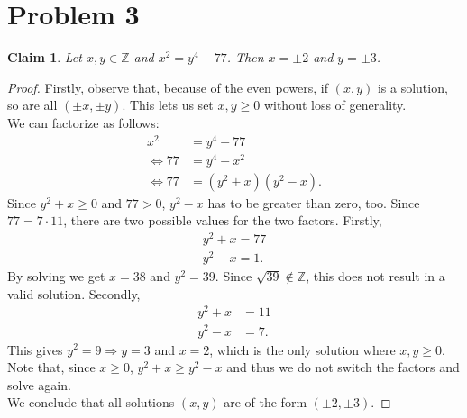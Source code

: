 \documentclass{article}
\newcommand{\Z}{\mathbb{Z}}
\newtheorem{claim}[section]{Claim}
\begin{document}
\section*{Problem 3}
\begin{claim}
  Let $x,y\in\Z$ and $x^2=y^4-77$. Then $x=\pm 2$ and $y=\pm 3$.
\end{claim}
\begin{proof}
  Firstly, observe that, because of the even powers, if $(x,y)$ is a solution, so are all $(\pm x, \pm y)$.
  This lets us set $x,y\geq 0$ without loss of generality.\\
  We can factorize as follows:
  \begin{align*}
    x^2&=y^4-77\\
    \Leftrightarrow 77&=y^4-x^2\\
    \Leftrightarrow 77&=(y^2+x)(y^2-x).
  \end{align*}
  Since $y^2+x\geq 0$ and $77>0$, $y^2-x$ has to be greater than zero, too.
  Since $77=7\cdot 11$, there are two possible values for the two factors.
  Firstly,
  \begin{align*}
    y^2+x = 77\\
    y^2-x = 1.
  \end{align*}
  By solving we get $x=38$ and $y^2=39$. Since $\sqrt{39}\not\in\Z$, this does not result in a valid solution.
  Secondly,
  \begin{align*}
    y^2+x&=11\\
    y^2-x&=7.
  \end{align*}
  This gives $y^2=9\Rightarrow y=3$ and $x=2$, which is the only solution where $x,y\geq 0$.
  Note that, since $x\geq 0$, $y^2+x\geq y^2-x$ and thus we do not switch the factors and solve again.\\
  We conclude that all solutions $(x,y)$ are of the form $(\pm 2, \pm 3)$.
\end{proof}
\end{document}
